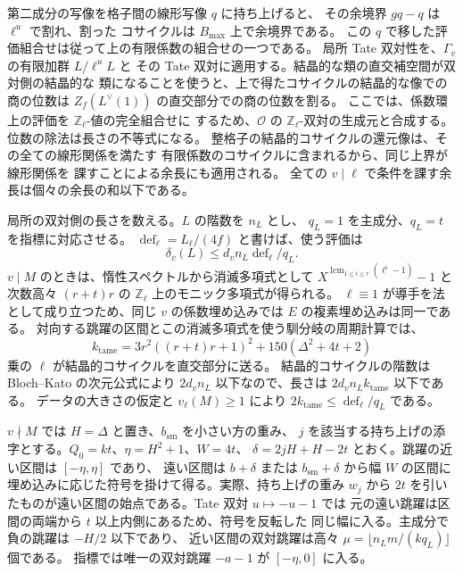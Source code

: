 第二成分の写像を格子間の線形写像 \(q\) に持ち上げると、
その余境界 \(gq-q\) は \(\ell^u\) で割れ、割った
コサイクルは \(B_{\max}\) 上で余境界である。
この \(q\) で移した評価組合せは従って上の有限係数の組合せの一つである。
局所 Tate 双対性を、\(\Gamma_v\) の有限加群 \(L/\ell^u L\) と
その Tate 双対に適用する。結晶的な類の直交補空間が双対側の結晶的な
類になることを使うと、上で得たコサイクルの結晶的な像での商の位数は
\(Z_f(L^\vee(1))\) の直交部分での商の位数を割る。
ここでは、係数環上の評価を \(\mathbb Z_\ell\)-値の完全組合せに
するため、\(\mathcal O\) の \(\mathbb Z_\ell\)-双対の生成元と合成する。
位数の除法は長さの不等式になる。
整格子の結晶的コサイクルの還元像は、その全ての線形関係を満たす
有限係数のコサイクルに含まれるから、同じ上界が線形関係を
課すことによる余長にも適用される。
全ての \(v\mid\ell\) で条件を課す余長は個々の余長の和以下である。

局所の双対側の長さを数える。\(L\) の階数を \(n_L\) とし、
\(q_L=1\) を主成分、\(q_L=t\) を指標に対応させる。
\(\operatorname{def}_\ell=L_\ell/(4f)\) と書けば、使う評価は
\[
 \delta_v(L)\le d_v n_L\operatorname{def}_\ell/q_L .
\]
\(v\mid M\) のときは、惰性スペクトルから消滅多項式として
\(X^{\operatorname{lcm}_{1\le i\le r}(\ell^i-1)}-1\) と
次数高々 \((r+t)r\) の \(\mathbb Z_\ell\) 上のモニック多項式が得られる。
\(\ell\equiv1\) が導手を法として成り立つため、同じ \(v\) の係数埋め込みでは
\(E\) の複素埋め込みは同一である。
対向する跳躍の区間とこの消滅多項式を使う馴分岐の周期計算では、
\[
 k_\mathrm{tame}=3r^2((r+t)r+1)^2+150(\Delta^2+4t+2)
\]
乗の \(\ell\) が結晶的コサイクルを直交部分に送る。
結晶的コサイクルの階数は Bloch--Kato の次元公式により
\(2d_v n_L\) 以下なので、長さは \(2d_v n_L k_\mathrm{tame}\) 以下である。
データの大きさの仮定と \(v_\ell(M)\ge1\) により
\(2k_\mathrm{tame}\le\operatorname{def}_\ell/q_L\) である。

\(v\nmid M\) では \(H=\Delta\) と置き、\(b_{\mathrm{sm}}\) を小さい方の重み、
\(j\) を該当する持ち上げの添字とする。\(Q_0=kt\)、\(\eta=H^2+1\)、\(W=4t\)、
\(\delta=2jH+H-2t\) とおく。跳躍の近い区間は \([-\eta,\eta]\) であり、
遠い区間は \(b+\delta\) または \(b_{\mathrm{sm}}+\delta\) から幅 \(W\) の区間に
埋め込みに応じた符号を掛けて得る。実際、持ち上げの重み \(w_j\) から \(2t\)
を引いたものが遠い区間の始点である。Tate 双対 \(u\mapsto-u-1\) では
元の遠い跳躍は区間の両端から \(t\) 以上内側にあるため、符号を反転した
同じ幅に入る。主成分で負の跳躍は \(-H/2\) 以下であり、
近い区間の双対跳躍は高々 \(\mu=\lfloor n_Lm/(kq_L)\rfloor\) 個である。
指標では唯一の双対跳躍 \(-a-1\) が \([-\eta,0]\) に入る。

